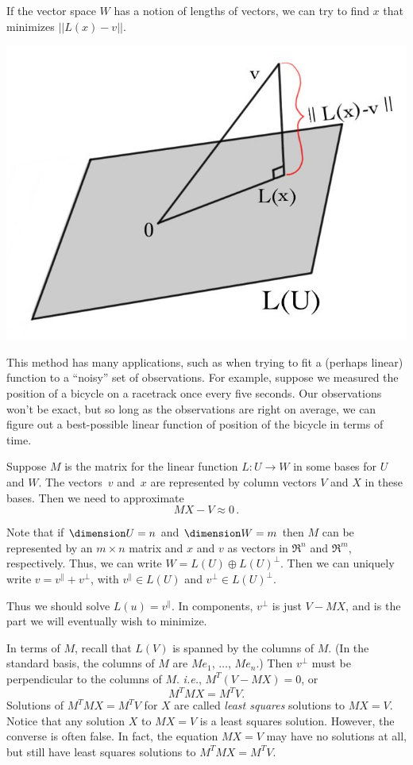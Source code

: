 If the vector space $W$ has a notion of lengths of vectors, we can try to find $x$ that minimizes $||L(x)-v||$.
\begin{center}
\includegraphics[alt={A plane L(U) and a vector v not in the plane.  The point L(x) makes a right angle to L(x)-v.},scale=.24]{minimize.jpg}
\end{center} 
This method has many applications, such as when trying to fit a (perhaps linear) function to a ``noisy'' set of observations.  For example, suppose we measured the position of a bicycle on a racetrack once every five seconds.  Our observations won't be exact, but so long as the observations are right on average, we can figure out a best-possible linear function of position of the bicycle in terms of time.

Suppose $M$ is the matrix for the linear function $L:U \to W$ in some bases for $U$ and $W$. The vectors~$v$ and~$x$ are represented by column vectors $V$ and $X$ in these bases.  Then we need to approximate
\[
MX-V\approx 0\, .
\]

Note that if $\dimension U=n$ and $\dimension W=m$ then $M$ can be represented by an $m\times n$ matrix and $x$ and $v$ as vectors in $\Re^n$ and $\Re^m$, respectively. Thus, we can write $W=L(U)\oplus L(U)^\perp$.  Then we can uniquely write $v=v^\parallel + v^\perp$, with $v^\parallel \in L(U)$ and $v^\perp \in L(U)^\perp$.  



Thus we should solve $L(u)=v^\parallel$.  In components, $v^\perp$ is just $V-MX$, and is the part we will eventually wish to minimize.  

In terms of $M$, recall that $L(V)$ is spanned by the columns of $M$.  (In the standard basis, the columns of $M$ are $Me_1$, 
$\ldots$, $Me_n$.)  Then $v^\perp$ must be perpendicular to the columns of $M$.  \textit{i.e.}, $M^T(V-MX)=0$, or
\[
M^TMX = M^TV.
\]
Solutions of $M^TMX = M^TV$ for $X$ are called \emph{least squares} solutions to $MX=V$.  
Notice that any solution $X$ to $MX=V$ is a least squares solution.  However, the converse is often false.  In fact, the equation $MX=V$ may have no solutions at all, but still have least squares solutions to $M^TMX = M^TV$.

